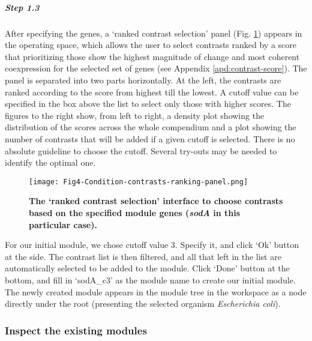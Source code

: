 \begin{small}
\subparagraph{Step 1.3}	
After specifying the genes, a `ranked contrast selection' panel
(Fig. \ref{fig:colombos-ranking}) appears in the operating space, which allows
the user to select contrasts ranked by a score that prioritizing those show
the highest magnitude of change and most coherent coexpression for the
selected set of genes (see Appendix \ref{apd:contrast-score}). The panel is
separated into two parts horizontally.  At the left, the contrasts are ranked
according to the score from highest till the lowest. A cutoff value can be
specified in the box above the list to select only those with higher
scores. The figures to the right show, from left to right, a density plot
showing the distribution of the scores across the whole compendium and a plot
showing the number of contrasts that will be added if a given cutoff is
selected.  There is no absolute guideline to choose the cutoff. Several
try-outs may be needed to identify the optimal one.


\begin{figure}[tb]
	\centering
  	\texttt{[image: Fig4-Condition-contrasts-ranking-panel.png]}
	\caption[COLOMBOS contrast ranking interface]{\textbf{The `ranked contrast 
	selection' interface to choose contrasts based on the specified module 
	genes (\textit{sodA} in this particular case).}}
	\label{fig:colombos-ranking}
\end{figure}

For our initial module, we chose cutoff value 3. Specify it, and click `Ok'
button at the side. The contrast list is then filtered, and all that left in
the list are automatically selected to be added to the module. Click `Done'
button at the bottom, and fill in `sodA\_c3' as the module name to create our
initial module.  The newly created module appears in the module tree in the
workspace as a node directly under the root (presenting the selected organism
\textit{Escherichia coli}).


\end{small} %



\subsubsection{Inspect the existing modules}


